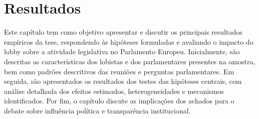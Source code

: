 \chapter{Resultados}
\label{chapter:resultados}
Este capítulo tem como objetivo apresentar e discutir os principais resultados empíricos da tese, respondendo às hipóteses formuladas e avaliando o impacto do lobby sobre a atividade legislativa no Parlamento Europeu. Inicialmente, são descritas as características dos lobistas e dos parlamentares presentes na amostra, bem como padrões descritivos das reuniões e perguntas parlamentares. Em seguida, são apresentados os resultados dos testes das hipóteses centrais, com análise detalhada dos efeitos estimados, heterogeneidades e mecanismos identificados. Por fim, o capítulo discute as implicações dos achados para o debate sobre influência política e transparência institucional.

% 




